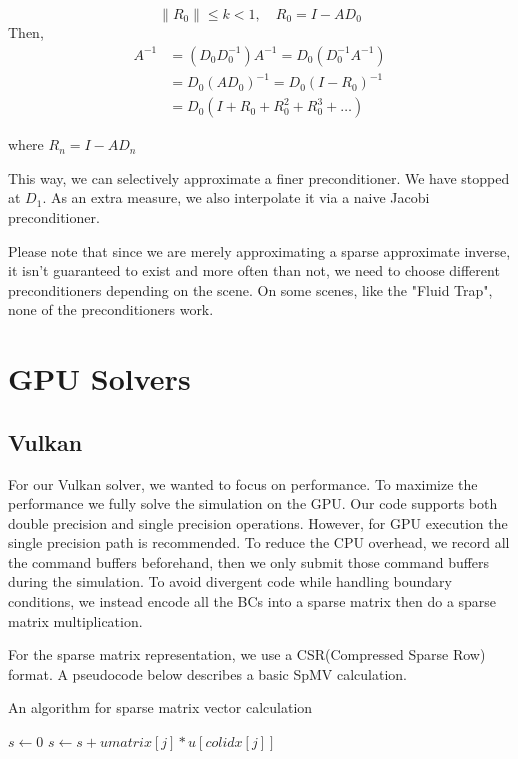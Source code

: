 \documentclass{article}
\begin{document}
\begin{equation}
\left\|R_{0}\right\| \leq k<1, \quad R_{0}=I-A D_{0}
\end{equation}
Then,
\begin{equation}
\begin{aligned}
A^{-1} &=\left(D_{0} D_{0}^{-1}\right) A^{-1}=D_{0}\left(D_{0}^{-1} A^{-1}\right) \\
&=D_{0}\left(A D_{0}\right)^{-1}=D_{0}\left(I-R_{0}\right)^{-1} \\
&=D_{0}\left(I+R_{0}+R_{0}^{2}+R_{0}^{3}+\ldots\right)
\end{aligned}
\end{equation}

where $R_n = I - AD_n$

This way, we can selectively approximate a finer preconditioner. We have stopped at $D_1$. As an extra measure, we also interpolate it via a naive Jacobi preconditioner.

Please note that since we are merely approximating a sparse approximate inverse, it isn't guaranteed to exist and more often than not, we need to choose different preconditioners depending on the scene. On some scenes, like the "Fluid Trap", none of the preconditioners work.

\section{GPU Solvers}

\subsection{Vulkan}

For our Vulkan solver, we wanted to focus on performance. To maximize the performance we fully solve the simulation on the GPU. Our code supports both double precision and single precision operations. However, for GPU execution the single precision path is recommended. To reduce the CPU overhead, we record all the command buffers beforehand, then we only submit those command buffers during the simulation. To avoid divergent code while handling boundary conditions, we instead encode all the BCs into a sparse matrix then do a sparse matrix multiplication.

For the sparse matrix representation, we use a CSR(Compressed Sparse Row) format. A pseudocode below describes a basic SpMV calculation.
\begin{algorithm}
    \caption{An algorithm for sparse matrix vector calculation}
    \begin{algorithmic}
            \State $s\gets 0$ 
                \State $s\gets s + umatrix[j] * u[colidx[j]]$
            \EndFor
        \EndIf
    \end{algorithmic}
\end{algorithm}
\end{document}
